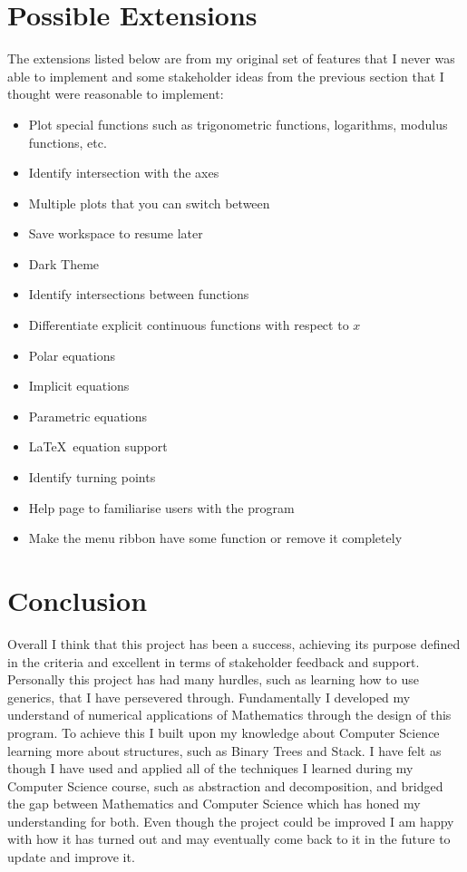 \documentclass[../../../main.tex]{subfiles}
\begin{document}
\section{Possible Extensions}%
The extensions listed below are from my original set of features that I never was able to implement and some stakeholder ideas from the previous section that I thought were reasonable to implement:
\begin{itemize}
	\item Plot special functions such as trigonometric functions, logarithms, modulus functions, etc.
	\item Identify intersection with the axes
	\item Multiple plots that you can switch between
	\item Save workspace to resume later
	\item Dark Theme
	\item Identify intersections between functions
	\item Differentiate explicit continuous functions with respect to $x$
	\item Polar equations
	\item Implicit equations
	\item Parametric equations
	\item \LaTeX \ equation support
	\item Identify turning points 
	\item Help page to familiarise users with the program
	\item Make the menu ribbon have some function or remove it completely
\end{itemize}
\section{Conclusion}%
Overall I think that this project has been a success, achieving its purpose defined in the criteria and excellent in terms of stakeholder feedback and support. Personally this project has had many hurdles, such as learning how to use generics, that I have persevered through. Fundamentally I developed my understand of numerical applications of Mathematics through the design of this program. To achieve this I built upon my knowledge about Computer Science learning more about structures, such as Binary Trees and Stack. I have felt as though I have used and applied all of the techniques I learned during my Computer Science course, such as abstraction and decomposition, and bridged the gap between Mathematics and Computer Science which has honed my understanding for both. Even though the project could be improved I am happy with how it has turned out and may eventually come back to it in the future to update and improve it.

\newpage
\end{document}
